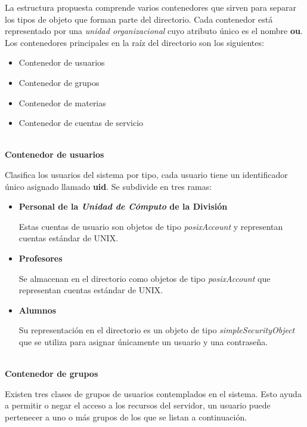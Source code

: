 La estructura propuesta comprende varios contenedores que sirven para separar los tipos de objeto que forman parte del directorio. Cada contenedor est\'{a} representado por una \textit{unidad organizacional} cuyo atributo \'{u}nico es el nombre \textbf{ou}. Los contenedores principales en la ra\'{i}z del directorio son los siguientes:

\begin{itemize}
  \item Contenedor de usuarios
  \item Contenedor de grupos
  \item Contenedor de materias
  \item Contenedor de cuentas de servicio
\end{itemize}

\textbf{\\ Contenedor de usuarios \\}

Clasifica los usuarios del sistema por tipo, cada usuario tiene un identificador \'{u}nico asignado llamado \textbf{uid}. Se subdivide en tres ramas:

\begin{itemize}

  \item \textbf{Personal de la \textit{Unidad de C\'{o}mputo} de la Divisi\'{o}n}

  Estas cuentas de usuario son objetos de tipo \textit{posixAccount} y representan cuentas est\'{a}ndar de \textsc{UNIX}.

  \item \textbf{Profesores}

  Se almacenan en el directorio como objetos de tipo \textit{posixAccount} que representan cuentas est\'{a}ndar de \textsc{UNIX}.

  \item \textbf{Alumnos}

  Su representaci\'{o}n en el directorio es un objeto de tipo \textit{simpleSecurityObject} que se utiliza para asignar \'{u}nicamente un usuario y una contrase\~{n}a.

\end{itemize}

\textbf{\\ Contenedor de grupos \\}

Existen tres clases de grupos de usuarios contemplados en el sistema. Esto ayuda a permitir o negar el acceso a los recursos del servidor, un usuario puede pertenecer a uno o m\'{a}s grupos de los que se listan a continuaci\'{o}n.

